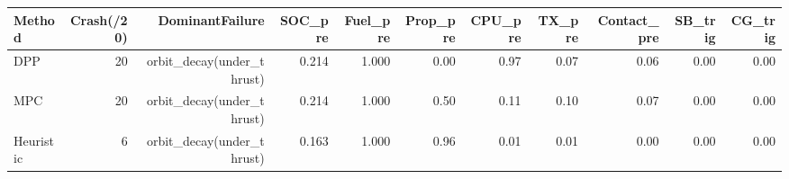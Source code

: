 \begin{tabular}{lrrrrrrrrrr}
\hline
Method & Crash(/20) & DominantFailure & SOC\_pre & Fuel\_pre & Prop\_pre & CPU\_pre & TX\_pre & Contact\_pre & SB\_trig & CG\_trig \\
\hline
DPP & 20 & orbit\_decay(under\_thrust) & 0.214 & 1.000 & 0.00 & 0.97 & 0.07 & 0.06 & 0.00 & 0.00 \\
MPC & 20 & orbit\_decay(under\_thrust) & 0.214 & 1.000 & 0.50 & 0.11 & 0.10 & 0.07 & 0.00 & 0.00 \\
Heuristic & 6 & orbit\_decay(under\_thrust) & 0.163 & 1.000 & 0.96 & 0.01 & 0.01 & 0.00 & 0.00 & 0.00 \\
\hline
\end{tabular}
